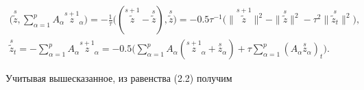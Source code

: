 \begin{gather*}


\bigg(\overset {s}{ \widetilde z}, \sum\limits_{\alpha=1}^p 


A_\alpha\overset {s+1}{z}_{\!\!\!\alpha}\bigg)=


-\frac{1}{\tau}\Big((\overset {s+1}{\widetilde z}-\overset {s}


{\widetilde z}),\overset {s}{\widetilde z}\Big)=


- 0.5\tau^{-1} \Big(\|\overset {s+1}{\widetilde z}\|^2 


- \|\overset {s}{\widetilde z} \|^2 -


\tau^2 \|\overset {s}{\widetilde z_t} \|^2 \Big), \\


%


\overset {s}{\widetilde z}{}_t  = - \sum\limits_{\alpha=1}^p 


A_\alpha \overset {s+1}{z}_{\!\!\!\alpha}=


- 0.5 \bigg(\sum\limits_{\alpha=1}^p


A_\alpha(\overset{s+1}{z}_{\!\!\!\alpha}+


\overset{s}{z}{}_\alpha) + \tau\sum\limits_{\alpha=1}^p (  A_\alpha


\overset{s}{z}{}_\alpha)_t \bigg).


\end{gather*}


Учитывая вышесказанное, из равенства (2.2) получим


